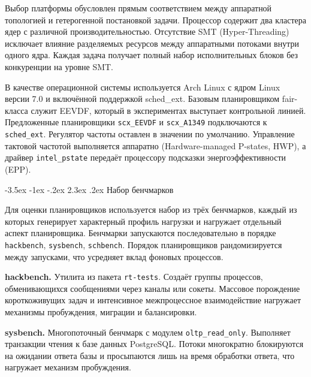 \documentclass[14pt, oneside]{extbook}
\makeatletter
\renewcommand\section{\@startsection {section}{1}{\z@}%
                                   {-3.5ex \@plus -1ex \@minus -.2ex}%
                                   {2.3ex \@plus.2ex}%
                                   {\normalfont\fontsize{16}{20}\selectfont\bfseries}}
\makeatother
\begin{document}
        Выбор платформы обусловлен прямым соответствием между
        аппаратной топологией и гетерогенной постановкой задачи.
        Процессор содержит два кластера ядер с различной
        производительностью.
        Отсутствие SMT (Hyper-Threading) исключает влияние
        разделяемых ресурсов между аппаратными потоками внутри
        одного ядра. Каждая задача получает полный набор
        исполнительных блоков без конкуренции на уровне SMT.

        В качестве операционной системы используется Arch Linux
        с ядром Linux версии 7.0 и включённой поддержкой
        sched\_ext.
        Базовым планировщиком fair-класса служит EEVDF,
        который в экспериментах выступает контрольной линией.
        Предложенные планировщики \texttt{scx\_EEVDF} и
        \texttt{scx\_A1349} подключаются к \texttt{sched\_ext}.
        Регулятор
        частоты оставлен в значении по умолчанию. Управление
        тактовой частотой выполняется аппаратно (Hardware-managed
        P-states, HWP), а драйвер \texttt{intel\_pstate}
        передаёт процессору подсказки энергоэффективности (EPP).


\section{Набор бенчмарков}

        Для оценки планировщиков используется набор из трёх
        бенчмарков, каждый из которых генерирует характерный
        профиль нагрузки и нагружает отдельный аспект
        планировщика. Бенчмарки запускаются последовательно в
        порядке \texttt{hackbench}, \texttt{sysbench},
        \texttt{schbench}. Порядок планировщиков рандомизируется
        между запусками, что усредняет вклад фоновых процессов.

        \textbf{hackbench.}
        Утилита из пакета \texttt{rt-tests}. Создаёт группы
        процессов, обменивающихся сообщениями через каналы или
        сокеты. Массовое порождение короткоживущих задач и
        интенсивное межпроцессное взаимодействие нагружает
        механизмы пробуждения, миграции и балансировки.

        \textbf{sysbench.}
        Многопоточный бенчмарк с модулем
        \texttt{oltp\_read\_only}. Выполняет транзакции чтения
        к базе данных PostgreSQL. Потоки многократно блокируются на
        ожидании ответа базы и просыпаются лишь на время
        обработки ответа, что нагружает механизм пробуждения.
\end{document}

